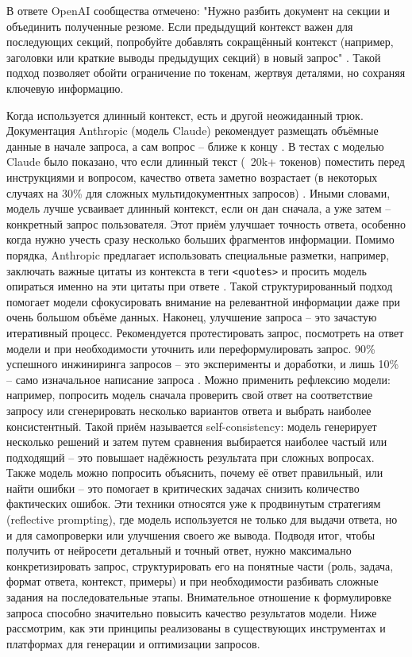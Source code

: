 В ответе OpenAI сообщества отмечено: "Нужно разбить документ на секции и объединить полученные резюме. Если предыдущий контекст важен для последующих секций, попробуйте добавлять сокращённый контекст (например, заголовки или краткие выводы предыдущих секций) в новый запрос" \cite{openai:longprompts}. Такой подход позволяет обойти ограничение по токенам, жертвуя деталями, но сохраняя ключевую информацию.


Когда используется длинный контекст, есть и другой неожиданный трюк. Документация Anthropic (модель Claude) рекомендует размещать объёмные данные в начале запроса, а сам вопрос – ближе к концу \cite{willison:longcontext}. В тестах с моделью Claude было показано, что если длинный текст (~20k+ токенов) поместить перед инструкциями и вопросом, качество ответа заметно возрастает (в некоторых случаях на 30\% для сложных мультидокументных запросов) \cite{willison:longcontext}. Иными словами, модель лучше усваивает длинный контекст, если он дан сначала, а уже затем – конкретный запрос пользователя. Этот приём улучшает точность ответа, особенно когда нужно учесть сразу несколько больших фрагментов информации. Помимо порядка, Anthropic предлагает использовать специальные разметки, например, заключать важные цитаты из контекста в теги \verb|<quotes>| и просить модель опираться именно на эти цитаты при ответе \cite{willison:longcontext}. Такой структурированный подход помогает модели сфокусировать внимание на релевантной информации даже при очень большом объёме данных. Наконец, улучшение запроса – это зачастую итеративный процесс. Рекомендуется протестировать запрос, посмотреть на ответ модели и при необходимости уточнить или переформулировать запрос. 90\% успешного инжиниринга запросов – это эксперименты и доработки, и лишь 10\% – само изначальное написание запроса \cite{reddit:prompteng}. Можно применить рефлексию модели: например, попросить модель сначала проверить свой ответ на соответствие запросу или сгенерировать несколько вариантов ответа и выбрать наиболее консистентный. Такой приём называется self-consistency: модель генерирует несколько решений и затем путем сравнения выбирается наиболее частый или подходящий – это повышает надёжность результата при сложных вопросах. Также модель можно попросить объяснить, почему её ответ правильный, или найти ошибки – это помогает в критических задачах снизить количество фактических ошибок\cite{lakera:2025}. Эти техники относятся уже к продвинутым стратегиям (reflective prompting), где модель используется не только для выдачи ответа, но и для самопроверки или улучшения своего же вывода\cite{restack:advprompt}. Подводя итог, чтобы получить от нейросети детальный и точный ответ, нужно максимально конкретизировать запрос, структурировать его на понятные части (роль, задача, формат ответа, контекст, примеры) и при необходимости разбивать сложные задания на последовательные этапы. Внимательное отношение к формулировке запроса способно значительно повысить качество результатов модели\cite{lakera:2025}.
Ниже рассмотрим, как эти принципы реализованы в существующих инструментах и платформах для генерации и оптимизации запросов.
